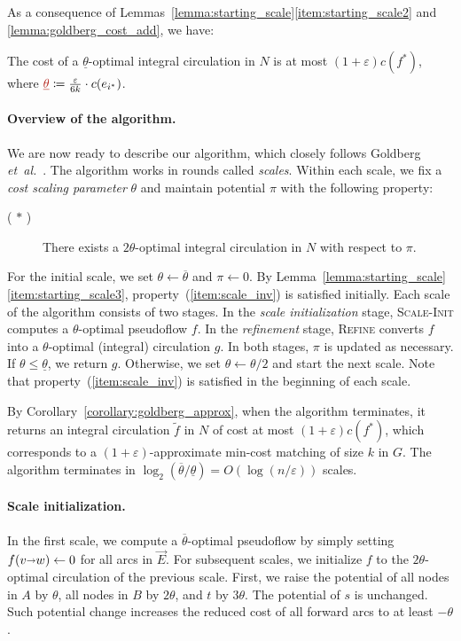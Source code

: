 \documentclass[11pt]{article}
\makeatletter
\def\etal{\emph{et~al.}}
\def\etal{\textit{et~al.}}
\def\eps{\varepsilon}
\def\arcto{\mathord\shortrightarrow}
\def\arc#1#2{#1\arcto#2}
\def\cost{c}
\theoremstyle{plain}
\numberwithin{figure}{section}
\def\EMPH#1{\textcolor{BrickRed}{{\emph{#1}}}}
\def\namedlabel#1#2{\begingroup
    #2%
    \def\@currentlabel{#2}%
    \phantomsection\label{#1}\endgroup
}
\makeatother
\begin{document}
As a consequence of Lemmas~\ref{lemma:starting_scale}\ref{item:starting_scale2}
and \ref{lemma:goldberg_cost_add}, we have:
%
\begin{corollary}
\label{corollary:goldberg_approx}
The cost of a $\underline{\theta}$-optimal integral circulation in $N$ is at
most $(1+\eps) \cost(f^*)$,
where $\EMPH{$\underline{\theta}$} \coloneqq \frac{\eps}{6k} \cdot c(e_{i^*})$.
\end{corollary}

\paragraph*{Overview of the algorithm.}
We are now ready to describe our algorithm, which closely follows Goldberg \etal~\cite{GHKT17}.
The algorithm works in rounds called \EMPH{scales}.
Within each scale, we fix a \EMPH{cost scaling parameter}
\EMPH{$\theta$} and maintain potential $\pi$ with the following property:

\begin{description}
\item[(\namedlabel{item:scale_inv}{$\ast$})]
	There exists a $2\theta$-optimal integral circulation in $N$ with respect to $\pi$.
\end{description}

For the initial scale, we set $\theta \gets \overline{\theta}$ and $\pi \gets 0$.
By Lemma~\ref{lemma:starting_scale}\ref{item:starting_scale3},
property~(\ref{item:scale_inv}) is satisfied initially.
Each scale of the algorithm consists of two stages.
In the \EMPH{scale initialization} stage, \textsc{Scale-Init}
computes a $\theta$-optimal pseudoflow $f$.
In the \EMPH{refinement} stage, \textsc{Refine} converts $f$ into
a $\theta$-optimal (integral) circulation $g$.
In both stages, $\pi$ is updated as necessary.
If $\theta \leq \underline{\theta}$, we return $g$.
Otherwise, we set $\theta \gets \theta/2$ and start the next scale.
Note that property~(\ref{item:scale_inv}) is satisfied in the beginning of each scale.

By Corollary~\ref{corollary:goldberg_approx}, when the algorithm terminates,
it returns an integral circulation $\tilde{f}$ in $N$ of cost at most
$(1+\eps) \cost(f^*)$, which corresponds to a $(1+\eps)$-approximate min-cost
matching of size $k$ in $G$.
The algorithm terminates in
$\log_2(\overline{\theta}/\underline{\theta}) = O(\log(n/\eps))$ scales.


\paragraph*{Scale initialization.}
In the first scale, we compute a $\overline{\theta}$-optimal pseudoflow by
simply setting $f(\arc vw) \gets 0$ for all arcs in $\vec{E}$.
For subsequent scales, we initialize $f$ to the $2\theta$-optimal circulation of the previous scale.
First, we raise the potential of all nodes in $A$ by $\theta$, all nodes in $B$ by $2\theta$,
and $t$ by $3\theta$.
The potential of $s$ is unchanged.
%
Such potential change increases the reduced cost of all forward arcs to at least
$-\theta$.
\end{document}

